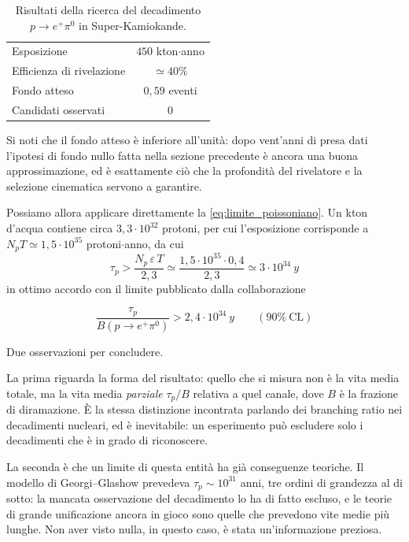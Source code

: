 \begin{table}[htbp]
\centering
\begin{tabular}{lc}
\hline
Esposizione & $450$ kton$\cdot$anno \\
Efficienza di rivelazione & $\simeq 40 \%$ \\
Fondo atteso & $0,59$ eventi \\
Candidati osservati & $0$ \\
\hline
\end{tabular}
\caption{Risultati della ricerca del decadimento $p \to e^+ \pi^0$ in Super-Kamiokande.}
\label{tab:superk}
\end{table}

Si noti che il fondo atteso è inferiore all'unità: dopo vent'anni di presa dati l'ipotesi di fondo nullo fatta nella sezione precedente è ancora una buona approssimazione, ed è esattamente ciò che la profondità del rivelatore e la selezione cinematica servono a garantire. 

Possiamo allora applicare direttamente la \eqref{eq:limite_poissoniano}. Un kton d'acqua contiene circa $3,3 \cdot 10^{32}$ protoni, per cui l'esposizione corrisponde a $N_p T \simeq 1,5 \cdot 10^{35}$ protoni$\cdot$anno, da cui
%
\begin{equation*}
    \tau_p > \frac{N_p \, \varepsilon \, T}{2,3} \simeq \frac{1,5 \cdot 10^{35} \cdot 0,4}{2,3} \simeq 3 \cdot 10^{34} \ y
\end{equation*}
in ottimo accordo con il limite pubblicato dalla collaborazione

\begin{tcolorbox}[colback=black!5!white, colframe=black!45!white, boxrule=0.8pt]
\begin{equation}
    \frac{\tau_p}{B(p \to e^+\pi^0)} > 2,4 \cdot 10^{34} \ y \qquad (90\% \ \text{CL})
\end{equation}
\end{tcolorbox}

Due osservazioni per concludere. 

La prima riguarda la forma del risultato: quello che si misura non è la vita media totale, ma la vita media \emph{parziale} $\tau_p/B$ relativa a quel canale, dove $B$ è la frazione di diramazione. È la stessa distinzione incontrata parlando dei branching ratio nei decadimenti nucleari, ed è inevitabile: un esperimento può escludere solo i decadimenti che è in grado di riconoscere. 

La seconda è che un limite di questa entità ha già conseguenze teoriche. Il modello di Georgi--Glashow prevedeva $\tau_p \sim 10^{31}$ anni, tre ordini di grandezza al di sotto: la mancata osservazione del decadimento lo ha di fatto escluso, e le teorie di grande unificazione ancora in gioco sono quelle che prevedono vite medie più lunghe. Non aver visto nulla, in questo caso, è stata un'informazione preziosa.